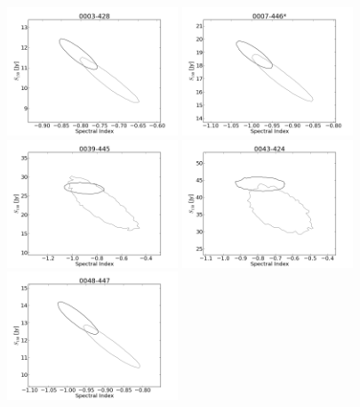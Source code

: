 \documentclass[preprint]{aastex}
\begin{document}
\begin{figure}[htbp]
\begin{center}
\includegraphics[width=2in]{plots/0003-428_SI_MCMC.png} %
\includegraphics[width=2in]{plots/0007-446_SI_MCMC.png} %
\includegraphics[width=2in]{plots/0039-445_SI_MCMC.png} %
\includegraphics[width=2in]{plots/0043-424_SI_MCMC.png} %
\includegraphics[width=2in]{plots/0048-447_SI_MCMC.png} %

\end{center}
\end{figure}
\end{document}
